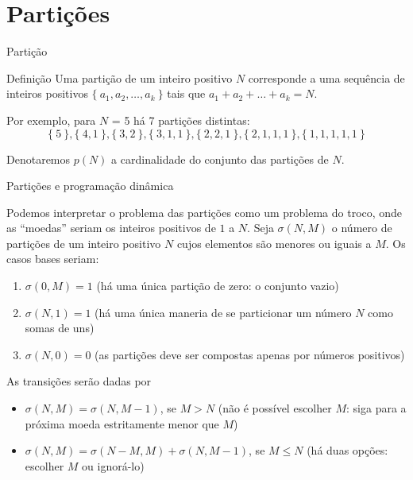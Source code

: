 \section*{Partições}

\begin{frame}[fragile]{Partição}

    \begin{block}{Definição}
        Uma partição de um inteiro positivo $N$ corresponde a uma sequência de inteiros positivos
        $\{\ a_1, a_2, \ldots, a_k\ \}$ tais que $a_1 + a_2 + \ldots + a_k = N$.
    \end{block}

    \vspace{0.2in}

    Por exemplo, para $N$ = 5 há 7 partições distintas:
\[
        \{\ 5\ \}, \{\ 4, 1\ \}, \{\ 3, 2\ \}, \{\ 3, 1, 1\ \}, \{\ 2, 2, 1\ \}, \{\ 2, 1, 1, 1\ \}, \{\ 1, 1, 1, 1, 1\ \}
\]

Denotaremos $p(N)$ a cardinalidade do conjunto das partições de $N$. 

\end{frame}

\begin{frame}[fragile]{Partições e programação dinâmica}

Podemos interpretar o problema das partições como um problema do troco, onde as ``moedas'' seriam
os inteiros positivos de $1$ a $N$. Seja $\sigma(N, M)$ o número de partições de um inteiro positivo $N$ cujos elementos
são menores ou iguais a $M$. Os casos bases seriam:
\begin{enumerate}
    \item $\sigma(0, M) = 1$  (há uma única partição de zero: o conjunto vazio)
    \item $\sigma(N, 1) = 1$ (há uma única maneria de se particionar um número $N$ como somas de uns)
    \item $\sigma(N, 0) = 0$ (as partições deve ser compostas apenas por números positivos)
\end{enumerate}

As transições serão dadas por
\begin{itemize}
    \item $\sigma(N, M) = \sigma(N, M - 1)$,  se $M > N$ (não é possível escolher $M$: siga para a próxima moeda estritamente menor que $M$)
    \item $\sigma(N, M) = \sigma(N - M, M) + \sigma(N, M - 1)$,  se $M \leq N$ (há duas opções: escolher $M$ ou ignorá-lo)
\end{itemize}

\end{frame}

